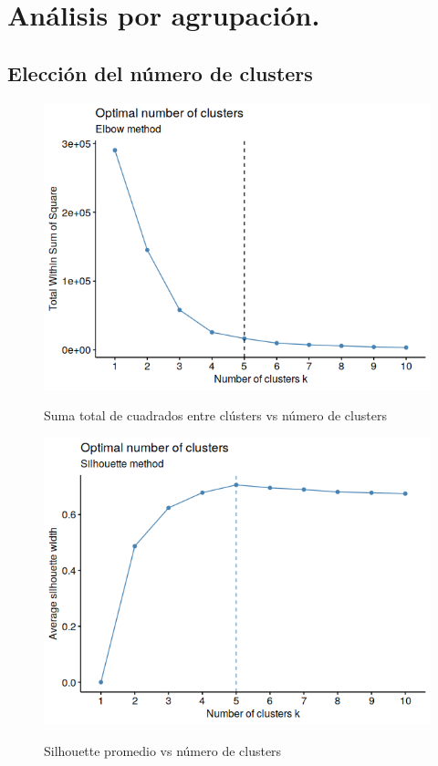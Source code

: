 \documentclass[pdf]{beamer}
\begin{document}
\section{Análisis por agrupación.}

\subsection{Elección del número de clusters}

\begin{frame}
\begin{figure}[h]
\centering
	\includegraphics[scale=.5]{images/clusterElbow.png} 
	\label{i_cluster_Elbow}
	\caption{Suma total de cuadrados entre clústers vs número de clusters}
\end{figure}
\end{frame}

\begin{frame}
\begin{figure}[h]
\centering
	\includegraphics[scale=.5]{images/clusterSilhouette.png} 
	\label{i_cluster_Silhouette}
	\caption{Silhouette promedio vs número de clusters}
\end{figure}
\end{frame}
\end{document}
